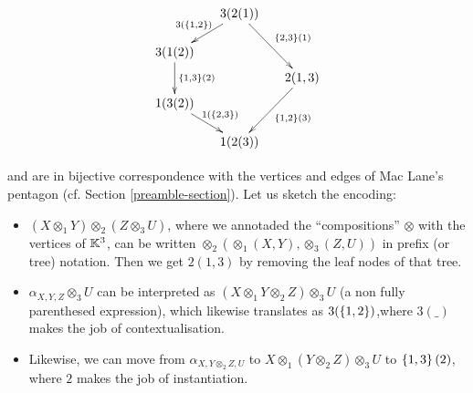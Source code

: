 \begin{center}
$$\xymatrix @-1.65pc {&& 3(2(1)) \ar @{->}[ddll]_{3(\set{1,2})} \ar @{->}[dddrr]^{\set{2,3}(1)}&& \\
 &&&&\\
3(1(2))   \ar @{->}[dd]^{\set{1,3}(2)}&&   && \\
 &&&&2(1,3) \ar @{->}[dddll]^{\set{1,2}(3)}\\
 1(3(2)) \ar @{->}[ddrr]^{1(\set{2,3})} &  &\\
 &&&&\\
 &&1(2(3))&&}$$
\end{center}
and are in bijective correspondence with the vertices and edges of Mac Lane's pentagon (cf. Section \ref{preamble-section}). 
  Let us sketch the encoding:
  \begin{itemize}
  \item $(X\otimes_1 Y)\otimes_2 (Z\otimes_3 U)$, where we annotaded the ``compositions'' $\otimes$ with the vertices of ${\mathbb K}^3$, can be written $\otimes_2(\otimes_1(X,Y),\otimes_3(Z,U))$ in prefix (or tree) notation. Then we get 
 $2(1,3)$ by removing the leaf nodes of that tree.
 \item $\alpha_{X,Y,Z}\otimes_3 U$ can be interpreted as $(X\otimes_1 Y\otimes_2 Z)\otimes_3 U$ (a non fully parenthesed expression), which likewise 
 translates as $3(\left\{1,2\right\})$,where $3(\_)$ makes the job of contextualisation.
 \item Likewise, we can move from
$\alpha_{X,Y\otimes_2 Z,U}$ to $X\otimes_1(Y\otimes_2 Z)\otimes_3 U$ to $\left\{1,3\right\}(2)$, where $2$ makes the job of instantiation.
\end{itemize}
